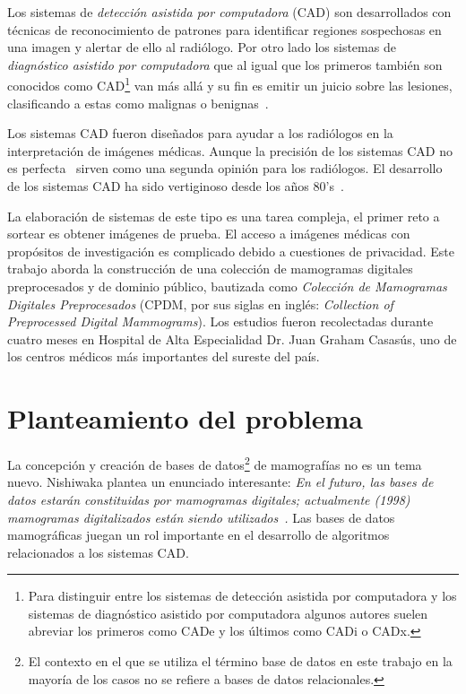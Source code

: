 Los sistemas de \textit{detección asistida por computadora} (CAD) son
desarrollados con técnicas de reconocimiento de patrones para identificar
regiones sospechosas en una imagen y alertar de ello al radiólogo. Por otro
lado los sistemas de \textit{diagnóstico asistido por computadora} que al igual
que los primeros también son conocidos como CAD\footnote{Para distinguir entre
los sistemas de detección asistida por computadora y los sistemas de
diagnóstico asistido por computadora algunos autores suelen abreviar los
primeros como CADe y los últimos como CADi o CADx.} van más allá y su fin es
emitir un juicio sobre las lesiones, clasificando a estas como malignas o
benignas~\cite{castellino2005computer}.

Los sistemas CAD fueron diseñados para ayudar a los radiólogos en la
interpretación de imágenes médicas. Aunque la precisión de los sistemas CAD no
es perfecta~\cite{fenton2007influence} sirven como una segunda opinión para los
radiólogos. El desarrollo de los sistemas CAD ha sido vertiginoso desde los
años 80's~\cite{giger2008anniversary}.

La elaboración de sistemas de este tipo es una tarea compleja, el primer reto a
sortear es obtener imágenes de prueba. El acceso a imágenes médicas con
propósitos de investigación es complicado debido a cuestiones de privacidad.
Este trabajo aborda la construcción de una colección de mamogramas digitales
preprocesados y de dominio público, bautizada como \textit{Colección de
Mamogramas Digitales Preprocesados} (CPDM, por sus siglas en inglés:
\textit{Collection of Preprocessed Digital Mammograms}). Los estudios fueron
recolectadas durante cuatro meses en Hospital de Alta Especialidad Dr. Juan
Graham Casasús, uno de los centros médicos más importantes del sureste del
país.

\section{Planteamiento del problema}

La concepción y creación de bases de datos\footnote{El contexto en el que se
utiliza el término base de datos en este trabajo en la mayoría de los casos no
se refiere a bases de datos relacionales.} de mamografías no es un tema nuevo.
Nishiwaka plantea un enunciado interesante: \textit{ En el futuro, las bases de
datos estarán constituidas por mamogramas digitales; actualmente (1998)
mamogramas digitalizados están siendo
utilizados~\cite{nishikawa1998mammographic}.} Las bases de datos mamográficas
juegan un rol importante en el desarrollo de algoritmos relacionados a los
sistemas CAD.

